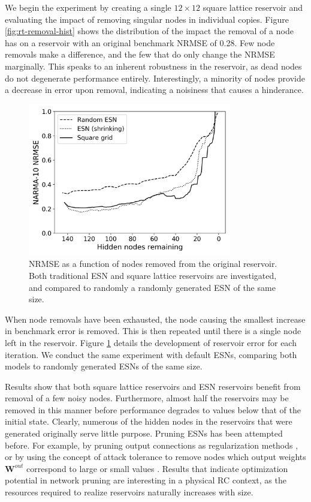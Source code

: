 We begin the experiment by creating a single $12 \times 12$ square lattice
reservoir and evaluating the impact of removing singular nodes in individual
copies. Figure \ref{fig:rt-removal-hist} shows the distribution of the impact
the removal of a node has on a reservoir with an original benchmark NRMSE of
0.28. Few node removals make a difference, and the few that do only change the
NRMSE marginally. This speaks to an inherent robustness in the reservoir, as
dead nodes do not degenerate performance entirely. Interestingly, a minority of
nodes provide a decrease in error upon removal, indicating a noisiness that
causes a hinderance.

\begin{figure}[htb]
  \centering
  \includegraphics[width=3.5in]{figures/shrink-performance.png}
  \caption{
    NRMSE as a function of nodes removed from the original reservoir. Both
traditional ESN and square lattice reservoirs are investigated, and compared to
randomly a randomly generated ESN of the same size.
  }
  \label{fig:sq-shrink-performance}
\end{figure}

When node removals have been exhausted, the node causing the smallest increase
in benchmark error is removed. This is then repeated until there is a single
node left in the reservoir. Figure \ref{fig:sq-shrink-performance} details the
development of reservoir error for each iteration. We conduct the same
experiment with default ESNs, comparing both models to randomly generated ESNs
of the same size.

Results show that both square lattice reservoirs and ESN reservoirs benefit from
removal of a few noisy nodes. Furthermore, almost half the reservoirs may be
removed in this manner before performance degrades to values below that of the
initial state. Clearly, numerous of the hidden nodes in the reservoirs that were
generated originally serve little purpose. Pruning ESNs has been attempted
before. For example, by pruning output connections as regularization methods
\cite{dutoit_pruning_2009}, or by using the concept of attack tolerance to
remove nodes which output weights $\mathbf{W}^{out}$ correspond to large or
small values \cite{haluszczynski_reservoir_2020}. Results that indicate
optimization potential in network pruning are interesting in a physical RC
context, as the resources required to realize reservoirs naturally increases
with size.

